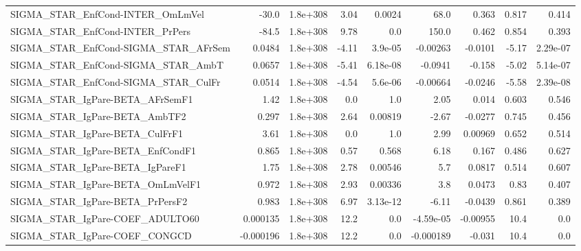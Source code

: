 \begin{tabular}{lrrrrrrrr}
SIGMA\_STAR\_EnfCond-INTER\_OmLmVel      &       -30.0 &     1.8e+308 &    3.04 &   0.0024 &       68.0 &       0.363 &        0.817 &         0.414 \\
SIGMA\_STAR\_EnfCond-INTER\_PrPers       &       -84.5 &     1.8e+308 &    9.78 &      0.0 &      150.0 &       0.462 &        0.854 &         0.393 \\
SIGMA\_STAR\_EnfCond-SIGMA\_STAR\_AFrSem  &      0.0484 &     1.8e+308 &   -4.11 &  3.9e-05 &   -0.00263 &     -0.0101 &        -5.17 &      2.29e-07 \\
SIGMA\_STAR\_EnfCond-SIGMA\_STAR\_AmbT    &      0.0657 &     1.8e+308 &   -5.41 & 6.18e-08 &    -0.0941 &      -0.158 &        -5.02 &      5.14e-07 \\
SIGMA\_STAR\_EnfCond-SIGMA\_STAR\_CulFr   &      0.0514 &     1.8e+308 &   -4.54 &  5.6e-06 &   -0.00664 &     -0.0246 &        -5.58 &      2.39e-08 \\
SIGMA\_STAR\_IgPare-BETA\_AFrSemF1       &        1.42 &     1.8e+308 &     0.0 &      1.0 &       2.05 &       0.014 &        0.603 &         0.546 \\
SIGMA\_STAR\_IgPare-BETA\_AmbTF2         &       0.297 &     1.8e+308 &    2.64 &  0.00819 &      -2.67 &     -0.0277 &        0.745 &         0.456 \\
SIGMA\_STAR\_IgPare-BETA\_CulFrF1        &        3.61 &     1.8e+308 &     0.0 &      1.0 &       2.99 &     0.00969 &        0.652 &         0.514 \\
SIGMA\_STAR\_IgPare-BETA\_EnfCondF1      &       0.865 &     1.8e+308 &    0.57 &    0.568 &       6.18 &       0.167 &        0.486 &         0.627 \\
SIGMA\_STAR\_IgPare-BETA\_IgPareF1       &        1.75 &     1.8e+308 &    2.78 &  0.00546 &        5.7 &      0.0817 &        0.514 &         0.607 \\
SIGMA\_STAR\_IgPare-BETA\_OmLmVelF1      &       0.972 &     1.8e+308 &    2.93 &  0.00336 &        3.8 &      0.0473 &         0.83 &         0.407 \\
SIGMA\_STAR\_IgPare-BETA\_PrPersF2       &       0.983 &     1.8e+308 &    6.97 & 3.13e-12 &      -6.11 &     -0.0439 &        0.861 &         0.389 \\
SIGMA\_STAR\_IgPare-COEF\_ADULTO60       &    0.000135 &     1.8e+308 &    12.2 &      0.0 &  -4.59e-05 &    -0.00955 &         10.4 &           0.0 \\
SIGMA\_STAR\_IgPare-COEF\_CONGCD         &   -0.000196 &     1.8e+308 &    12.2 &      0.0 &  -0.000189 &      -0.031 &         10.4 &           0.0 \\

\end{tabular}
